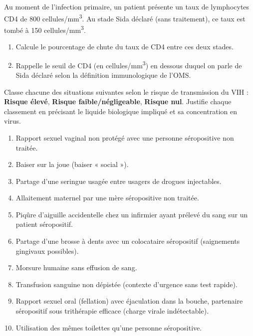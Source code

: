 \documentclass[11pt]{article}
\newcounter{popsec}
\newcounter{popsub}
\newcommand{\courssub}[1]{%
  \stepcounter{popsub}%
  \par\vspace{9pt}\noindent{\popxbold\fontsize{11.5}{13}\selectfont\color{popink}{\color{poporange}\thepopsec.\thepopsub}\hspace{6pt}#1}\par\nopagebreak\vspace{4pt}
}
\begin{document}
\begin{exercice}
Au moment de l'infection primaire, un patient présente un taux de lymphocytes CD4 de \num{800} cellules/mm\textsuperscript{3}. Au stade Sida déclaré (sans traitement), ce taux est tombé à \num{150} cellules/mm\textsuperscript{3}.
\begin{enumerate}
    \item Calcule le pourcentage de chute du taux de CD4 entre ces deux stades.
    \item Rappelle le seuil de CD4 (en cellules/mm\textsuperscript{3}) en dessous duquel on parle de Sida déclaré selon la définition immunologique de l'OMS.
\end{enumerate}
\end{exercice}

\courssub{Je m'entraîne}

\begin{exercice}
Classe chacune des situations suivantes selon le risque de transmission du VIH : \textbf{Risque élevé}, \textbf{Risque faible/négligeable}, \textbf{Risque nul}. Justifie chaque classement en précisant le liquide biologique impliqué et sa concentration en virus.
\begin{enumerate}
    \item Rapport sexuel vaginal non protégé avec une personne séropositive non traitée.
    \item Baiser sur la joue (baiser « social »).
    \item Partage d'une seringue usagée entre usagers de drogues injectables.
    \item Allaitement maternel par une mère séropositive non traitée.
    \item Piqûre d'aiguille accidentelle chez un infirmier ayant prélevé du sang sur un patient séropositif.
    \item Partage d'une brosse à dents avec un colocataire séropositif (saignements gingivaux possibles).
    \item Morsure humaine sans effusion de sang.
    \item Transfusion sanguine non dépistée (contexte d'urgence sans test rapide).
    \item Rapport sexuel oral (fellation) avec éjaculation dans la bouche, partenaire séropositif sous trithérapie efficace (charge virale indétectable).
    \item Utilisation des mêmes toilettes qu'une personne séropositive.
\end{enumerate}
\end{exercice}
\end{document}

